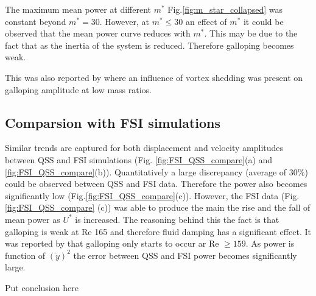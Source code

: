  

The maximum mean power at different $m^*$ Fig.\ref{fig:m_star_collapsed} was constant beyond $m^*=30$. However, at $m^* \leq 30$ an effect of $m^*$ it could be observed that the mean power curve reduces with $m^*$. This may be due to the fact that as the inertia of the system is reduced. Therefore galloping becomes weak.


 
 
 This was also reported by \cite{Joly2012} where an influence of vortex shedding was present on galloping amplitude at low mass ratios. 



 

\subsection{Comparsion with FSI simulations}
 Similar trends are captured for both displacement and velocity amplitudes between QSS and FSI simulations (Fig. \ref{fig:FSI_QSS_compare}(a) and \ref{fig:FSI_QSS_compare}(b)). Quantitatively a large discrepancy (average of $30\%$) could be observed between QSS and FSI data. Therefore the power also becomes significantly low (Fig.\ref{fig:FSI_QSS_compare}(c)). However, the FSI data (Fig.\ref{fig:FSI_QSS_compare} (c)) was able to produce the main the rise and the fall of mean power as $U^*$ is increased. The reasoning behind this the fact is that galloping is weak at Re 165  and therefore fluid damping has a significant effect. It was reported by \cite{Barrero-Gil2009} that galloping only starts to occur ar Re $\geq 159$. As power is function of $(\dot{y})^2$ the error between QSS and FSI power becomes significantly large.  
 
 Put conclusion here 
 
 










 

 
 
 

 
 



 
 
 
 
 
 
 
 
 
 
  
 
 